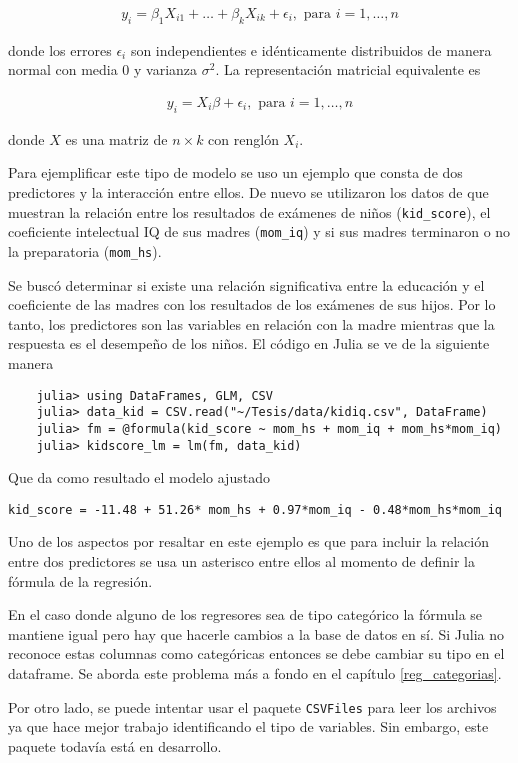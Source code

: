 \begin{equation*}
    \begin{aligned}
    y_i = \beta_1 X_{i1} + \dots + \beta_k X_{ik} + \epsilon_i, \text{ para } i = 1, \dots, n
    \end{aligned}
\end{equation*}

\noindent donde los errores $\epsilon_i$ son independientes e idénticamente distribuidos de manera normal con media 0 y varianza $\sigma^2$. La representación matricial equivalente es 

\begin{equation} \label{eq_rlm}
    \begin{aligned}
        y_i = X_i \beta + \epsilon_i, \text{ para } i = 1, \dots, n
    \end{aligned}
\end{equation}

\noindent donde $X$ es una matriz de $n \times k$ con renglón $X_i$.

Para ejemplificar este tipo de modelo se uso un ejemplo que consta de dos predictores y la interacción entre ellos. De nuevo se utilizaron los datos de \cite{regression_other_stories} que muestran la relación entre los resultados de exámenes de niños (\texttt{kid\_score}), el coeficiente intelectual IQ de sus madres (\texttt{mom\_iq}) y si sus madres terminaron o no la preparatoria (\texttt{mom\_hs}). 

Se buscó determinar si existe una relación significativa entre la educación y el coeficiente de las madres con los resultados de los exámenes de sus hijos. Por lo tanto, los predictores son las variables en relación con la madre mientras que la respuesta es el desempeño de los niños. El código en \textsf{Julia} se ve de la siguiente manera

\begin{verbatim}
    julia> using DataFrames, GLM, CSV
    julia> data_kid = CSV.read("~/Tesis/data/kidiq.csv", DataFrame)
    julia> fm = @formula(kid_score ~ mom_hs + mom_iq + mom_hs*mom_iq)
    julia> kidscore_lm = lm(fm, data_kid)
\end{verbatim}

Que da como resultado el modelo ajustado

\texttt{kid\_score = -11.48 + 51.26* mom\_hs + 0.97*mom\_iq - 0.48*mom\_hs*mom\_iq}

Uno de los aspectos por resaltar en este ejemplo es que para incluir la relación entre dos predictores se usa un asterisco entre ellos al momento de definir la fórmula de la regresión. 

En el caso donde alguno de los regresores sea de tipo categórico la fórmula se mantiene igual pero hay que hacerle cambios a la base de datos en sí. Si \textsf{Julia} no reconoce estas columnas como categóricas entonces se debe cambiar su tipo en el dataframe. Se aborda este problema más a fondo en el capítulo \ref{reg_categorias}. 

Por otro lado, se puede intentar usar el paquete \texttt{CSVFiles} para leer los archivos ya que hace mejor trabajo identificando el tipo de variables. Sin embargo, este paquete todavía está en desarrollo. 
